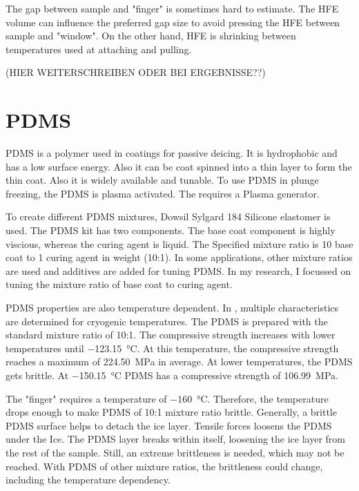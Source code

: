 The gap between sample and "finger" is sometimes hard to estimate. The HFE volume can influence the preferred gap size to avoid pressing the HFE between sample and "window". On the other hand, HFE is shrinking between temperatures used at attaching and pulling.

 (HIER WEITERSCHREIBEN ODER BEI ERGEBNISSE??) 

\section{PDMS}

PDMS is a polymer used in coatings for passive deicing. It is hydrophobic and has a low surface energy. Also it can be coat spinned into a thin layer to form the thin coat. Also it is widely available and tunable. To use PDMS in plunge freezing, the PDMS is plasma activated. The requires a Plasma generator.

To create different PDMS mixtures, Dowsil Sylgard 184 Silicone elastomer is used\cite{DOW.}. The PDMS kit has two components. The base coat component is highly viscious, whereas the curing agent is liquid. The Specified mixture ratio is 10 base coat to 1 curing agent in weight (10:1). In some applications, other mixture ratios are used and additives are added for tuning PDMS. In my research, I focussed on tuning the mixture ratio of base coat to curing agent. 

PDMS properties are also temperature dependent. In \cite{Zhang.2020}, multiple characteristics are determined for cryogenic temperatures. The PDMS is prepared with the standard mixture ratio of 10:1. The compressive strength increases with lower temperatures until \SI{-123.15}{\degreeCelsius}. At this temperature, the compressive strength reaches a maximum of \SI{224.50}{\mega\pascal} in average. At lower temperatures, the PDMS gets brittle. At \SI{-150.15}{\degreeCelsius} PDMS has a compressive strength of \SI{106.99}{\mega\pascal}.

The "finger" requires a temperature of \SI{-160}{\degreeCelsius}. Therefore, the temperature drops enough to make PDMS of 10:1 mixture ratio brittle. Generally, a brittle PDMS surface helps to detach the ice layer. Tensile forces loosens the PDMS under the Ice. The PDMS layer breaks within itself, loosening the ice layer from the rest of the sample. Still, an extreme brittleness is needed, which may not be reached. With PDMS of other mixture ratios, the brittleness could change, including the temperature dependency.

